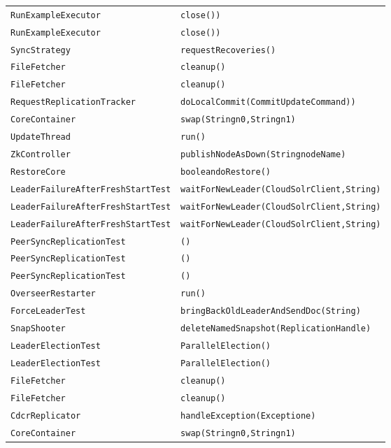 \begin{center}
\begin{longtable}{ll}
\lstinline/RunExampleExecutor/&{\lstinline/close())/}\\
\lstinline/RunExampleExecutor/&{\lstinline/close())/}\\
\lstinline/SyncStrategy/&{\lstinline/requestRecoveries()/}\\
\lstinline/FileFetcher/&{\lstinline/cleanup()/}\\
\lstinline/FileFetcher/&{\lstinline/cleanup()/}\\
\lstinline/RequestReplicationTracker/&{\lstinline/doLocalCommit(CommitUpdateCommand))/}\\
\lstinline/CoreContainer/&{\lstinline/swap(Stringn0,Stringn1)/}\\
\lstinline/UpdateThread/&{\lstinline/run()/}\\
\lstinline/ZkController/&{\lstinline/publishNodeAsDown(StringnodeName)/}\\
\lstinline/RestoreCore/&{\lstinline/booleandoRestore()/}\\
\lstinline/LeaderFailureAfterFreshStartTest/&{\lstinline/waitForNewLeader(CloudSolrClient,String)/}\\
\lstinline/LeaderFailureAfterFreshStartTest/&{\lstinline/waitForNewLeader(CloudSolrClient,String)/}\\
\lstinline/LeaderFailureAfterFreshStartTest/&{\lstinline/waitForNewLeader(CloudSolrClient,String)/}\\
\lstinline/PeerSyncReplicationTest/&{\lstinline/()/}\\
\lstinline/PeerSyncReplicationTest/&{\lstinline/()/}\\
\lstinline/PeerSyncReplicationTest/&{\lstinline/()/}\\
\lstinline/OverseerRestarter/&{\lstinline/run()/}\\
\lstinline/ForceLeaderTest/&{\lstinline/bringBackOldLeaderAndSendDoc(String)/}\\
\lstinline/SnapShooter/&{\lstinline/deleteNamedSnapshot(ReplicationHandle)/}\\
\lstinline/LeaderElectionTest/&{\lstinline/ParallelElection()/}\\
\lstinline/LeaderElectionTest/&{\lstinline/ParallelElection()/}\\
\lstinline/FileFetcher/&{\lstinline/cleanup()/}\\
\lstinline/FileFetcher/&{\lstinline/cleanup()/}\\
\lstinline/CdcrReplicator/&{\lstinline/handleException(Exceptione)/}\\
\lstinline/CoreContainer/&{\lstinline/swap(Stringn0,Stringn1)/}\\

\end{longtable}
\end{center}
